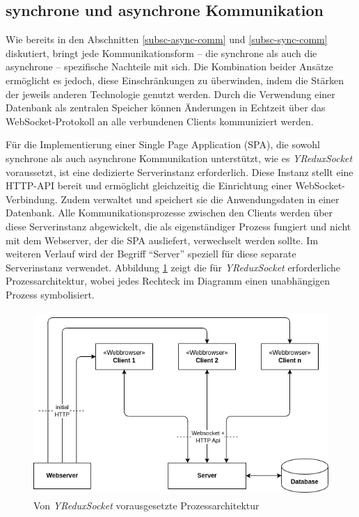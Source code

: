 \documentclass[12pt]{book}          %
\begin{document}
\subsection{synchrone und asynchrone Kommunikation}
\label{subsc-sync-and-async-comm}

Wie bereits in den Abschnitten \ref{subsc-async-comm} und \ref{subsc-sync-comm} diskutiert, bringt jede Kommunikationsform – die synchrone als auch die asynchrone – spezifische Nachteile mit sich. Die Kombination beider Ansätze ermöglicht es jedoch, diese Einschränkungen zu überwinden, indem die Stärken der jeweils anderen Technologie genutzt werden. Durch die Verwendung einer Datenbank als zentralen Speicher können Änderungen in Echtzeit über das WebSocket-Protokoll an alle verbundenen Clients kommuniziert werden.

Für die Implementierung einer Single Page Application (SPA), die sowohl synchrone als auch asynchrone Kommunikation unterstützt, wie es \textit{YReduxSocket} voraussetzt, ist eine dedizierte Serverinstanz erforderlich. Diese Instanz stellt eine HTTP-API bereit und ermöglicht gleichzeitig die Einrichtung einer WebSocket-Verbindung. Zudem verwaltet und speichert sie die Anwendungsdaten in einer Datenbank. Alle Kommunikationsprozesse zwischen den Clients werden über diese Serverinstanz abgewickelt, die als eigenständiger Prozess fungiert und nicht mit dem Webserver, der die SPA ausliefert, verwechselt werden sollte. Im weiteren Verlauf wird der Begriff "`Server"' speziell für diese separate Serverinstanz verwendet. Abbildung \ref{spa-sync-and-async-comm-architecture} zeigt die für \textit{YReduxSocket} erforderliche Prozessarchitektur, wobei jedes Rechteck im Diagramm einen unabhängigen Prozess symbolisiert.

\begin{figure}[htbp]
\centering
\includegraphics[height=7cm]{abbildungen/spa/spa-sync-and-async-comm.png}
\caption{Von \textit{YReduxSocket} vorausgesetzte Prozessarchitektur} 
\label{spa-sync-and-async-comm-architecture}
\end{figure}
\end{document}
